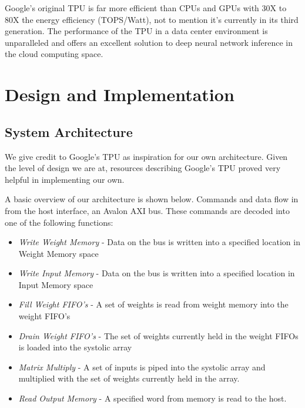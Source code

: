 \documentclass[11pt, conference, onecolumn]{IEEEtran}
\begin{document}
    Google’s original TPU is far more efficient than CPUs and GPUs with 30X to
    80X the energy efficiency (TOPS/Watt), not to mention it’s currently in its third
    generation. The performance of the TPU in a data center environment is unparalleled
    and offers an excellent solution to deep neural network inference in the cloud computing
    space.


\section{Design and Implementation}

    \subsection{System Architecture}
        We give credit to Google's TPU as inspiration for our own architecture. Given the
        level of design we are at, resources describing Google's TPU proved very helpful
        in implementing our own.

        A basic overview of our architecture is shown below. Commands and data flow in
        from the host interface, an Avalon AXI bus. These commands are decoded into one of
        the following functions:

        \begin{center}
        \begin{itemize}

            \item{\textit{Write Weight Memory} - Data on the bus is written into a
            specified location in Weight Memory space}

            \item{\textit{Write Input Memory} - Data on the bus is written into a
            specified location in Input Memory space}

            \item{\textit{Fill Weight FIFO's} - A set of weights is read from weight
            memory into the weight FIFO's}

            \item{\textit{Drain Weight FIFO's} - The set of weights currently held in
            the weight FIFOs is loaded into the systolic array}

            \item{\textit{Matrix Multiply} - A set of inputs is piped into the systolic
            array and multiplied with the set of weights currently held in the array.}

            \item{\textit{Read Output Memory} - A specified word from memory is read to
            the host.}
        \end{itemize}
        \end{center}
\end{document}
